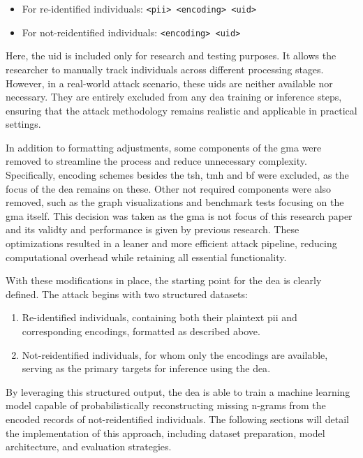 \begin{itemize}
    \item For re-identified individuals: \texttt{<\ac{pii}> <encoding> <uid>}
    \item For not-reidentified individuals: \texttt{<encoding> <uid>}
\end{itemize}

Here, the uid is included only for research and testing purposes.
It allows the researcher to manually track individuals across different processing stages.
However, in a real-world attack scenario, these uids are neither available nor necessary.
They are entirely excluded from any \ac{dea} training or inference steps, ensuring that the attack methodology remains realistic and applicable in practical settings.

In addition to formatting adjustments, some components of the \ac{gma} were removed to streamline the process and reduce unnecessary complexity.
Specifically, encoding schemes besides the \ac{tsh}, \ac{tmh} and \ac{bf} were excluded, as the focus of the \ac{dea} remains on these.
Other not required components were also removed, such as the graph visualizations and benchmark tests focusing on the \ac{gma} itself.
This decision was taken as the \ac{gma} is not focus of this research paper and its validty and performance is given by previous research.
These optimizations resulted in a leaner and more efficient attack pipeline, reducing computational overhead while retaining all essential functionality.

With these modifications in place, the starting point for the \ac{dea} is clearly defined.
The attack begins with two structured datasets:

\begin{enumerate}
    \item Re-identified individuals, containing both their plaintext \ac{pii} and corresponding encodings, formatted as described above.
    \item Not-reidentified individuals, for whom only the encodings are available, serving as the primary targets for inference using the \ac{dea}.
\end{enumerate}

By leveraging this structured output, the \ac{dea} is able to train a machine learning model capable of probabilistically reconstructing missing n-grams from the encoded records of not-reidentified individuals.
The following sections will detail the implementation of this approach, including dataset preparation, model architecture, and evaluation strategies.

